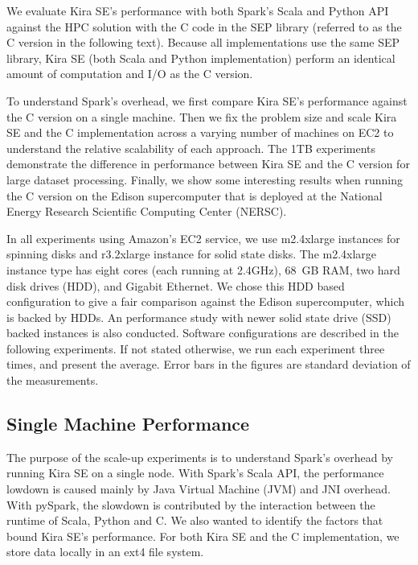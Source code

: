 \documentclass[10pt,journal,compsoc]{IEEEtran}
\begin{document}
We evaluate Kira SE's performance with both Spark's Scala and Python API against the HPC solution with the 
C code in the SEP library (referred to as the C version in the following text). 
Because all implementations use the same SEP library, Kira SE (both Scala and Python implementation) 
perform an identical amount of computation and I/O as the C version.

To understand Spark's overhead, we first compare Kira SE's performance against the C version on a single
machine. Then we fix the problem size and scale Kira SE and the C implementation across a
varying number of machines on EC2 to understand the relative scalability of each approach.
The 1TB experiments demonstrate the difference in performance between Kira SE and the C version
for large dataset processing. Finally, we show some interesting results when running the C
version on the Edison supercomputer that is deployed at the National Energy Research Scientific Computing Center (NERSC).

In all experiments using Amazon's EC2 service, we use m2.4xlarge instances for spinning disks and r3.2xlarge instance for solid state disks.
The m2.4xlarge instance type has eight cores (each running at 2.4GHz), 68~GB RAM, two hard disk drives (HDD), and Gigabit Ethernet. 
We chose this HDD based configuration to give a fair comparison against the Edison supercomputer, which is backed by HDDs. 
An performance study with newer solid state drive (SSD) backed instances is also conducted.
Software configurations are described in the following experiments.
If not stated otherwise, we run each experiment three times, and present the average.
Error bars in the figures are standard deviation of the measurements.

\subsection{Single Machine Performance}
\label{sec:Performance-scaleup}

The purpose of the scale-up experiments is to understand Spark's overhead by running
Kira SE on a single node. 
With Spark's Scala API, the performance lowdown is caused mainly by Java Virtual Machine (JVM) and JNI overhead.
With pySpark, the slowdown is contributed by the interaction between the runtime of Scala, Python and C. 
We also wanted to identify the factors that bound Kira SE's performance. 
For both Kira SE and the C implementation, we store data locally in an ext4 file system.
\end{document}
